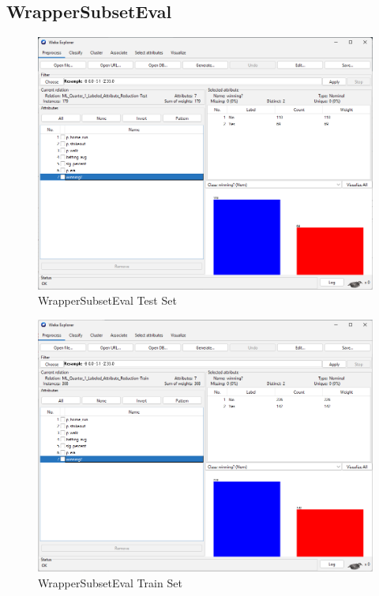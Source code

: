 \documentclass[12pt]{article}
\begin{document}
\subsection{WrapperSubsetEval}
\begin{figure}[h!]
    \includegraphics[scale=0.4]{./images/WrapperSubsetEval/TestSet.png}
\centering
    \caption{WrapperSubsetEval Test Set}
    \label{fig:WSETest}
\end{figure}
\begin{figure}[h!]
    \includegraphics[scale=0.4]{./images/WrapperSubsetEval/TrainSet.png}
\centering
    \caption{WrapperSubsetEval Train Set}
    \label{fig:WSETrain}
\end{figure}
\end{document}
